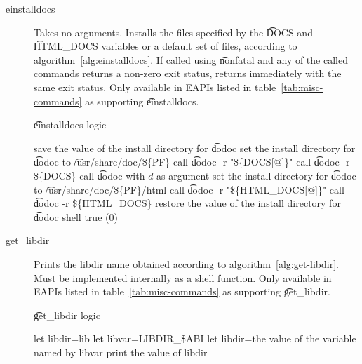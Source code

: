 \begin{description}
\item[einstalldocs]  Takes no arguments. Installs the files specified
    by the \t{DOCS} and \t{HTML_DOCS} variables or a default set of files, according to
    algorithm~\ref{alg:einstalldocs}. If called using \t{nonfatal} and any of the called commands
    returns a non-zero exit status, returns immediately with the same exit status. Only available
    in EAPIs listed in table~\ref{tab:misc-commands} as supporting \t{einstalldocs}.

\begin{algorithm}
\caption{\t{einstalldocs} logic} \label{alg:einstalldocs}
\begin{algorithmic}[1]
\STATE save the value of the install directory for \t{dodoc}
\STATE set the install directory for \t{dodoc} to \t{/usr/share/doc/\$\{PF\}}
    \STATE call \t{dodoc -r "\$\{DOCS[@]\}"}
    \STATE call \t{dodoc -r \$\{DOCS\}}
            \STATE call \t{dodoc} with $d$ as argument
        \ENDIF
    \ENDFOR
\ENDIF
\STATE set the install directory for \t{dodoc} to \t{/usr/share/doc/\$\{PF\}/html}
    \STATE call \t{dodoc -r "\$\{HTML_DOCS[@]\}"}
    \STATE call \t{dodoc -r \$\{HTML_DOCS\}}
\ENDIF
\STATE restore the value of the install directory for \t{dodoc}
\RETURN shell true (0)
\end{algorithmic}
\end{algorithm}

\item[get_libdir]  Prints the libdir name obtained according to
    algorithm~\ref{alg:get-libdir}. Must be implemented internally as a shell function.
    Only available in EAPIs listed in table~\ref{tab:misc-commands} as supporting \t{get_libdir}.

\begin{algorithm}
\caption{\t{get_libdir} logic} \label{alg:get-libdir}
\begin{algorithmic}[1]
\STATE let libdir=lib
    \STATE let libvar=LIBDIR_\$ABI
        \STATE let libdir=the value of the variable named by libvar
    \ENDIF
\ENDIF
\STATE print the value of libdir
\end{algorithmic}
\end{algorithm}

\end{description}

